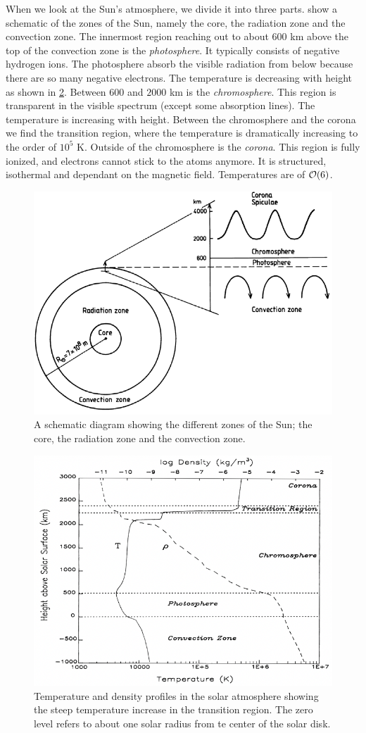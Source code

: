 When we look at the Sun's atmosphere, we divide it into three parts.  show a schematic of the zones of the Sun, namely the core, the radiation zone and the convection zone. The innermost region reaching out to about 600 km above the top of the convection zone is the \emph{photosphere}. It typically consists of negative hydrogen ions. The photosphere absorb the visible radiation from below because there are so many negative electrons. The temperature is decreasing with height as shown in \cref{fig:L9_sun_temperatures}. Between 600 and \(\num{2000}\) km is the \emph{chromosphere}. This region is transparent in the visible spectrum (except some absorption lines). The temperature is increasing with height. Between the chromosphere and the corona we find the transition region, where the temperature is dramatically increasing to the order of \(10^5\) K. Outside of the chromosphere is the \emph{corona}. This region is fully ionized, and electrons cannot stick to the atoms anymore. It is structured, isothermal and dependant on the magnetic field. Temperatures are of \(\mathcal{O}{(6)}\).
\begin{figure}[t]
    \centering
    \includegraphics[width=.6\linewidth]{bilder/L9_zones_in_the_sun.png}
    \caption{A schematic diagram showing the different zones of the Sun; the core, the radiation zone and the convection zone.}\label{fig:L9_zones_in_the_sun}
\end{figure}
\begin{figure}[t]
    \centering
    \includegraphics[width=.6\linewidth]{bilder/L9_sun_temperature.png}
    \caption{Temperature and density profiles in the solar atmosphere showing the steep temperature increase in the transition region. The zero level refers to about one solar radius from te center of the solar disk.}\label{fig:L9_sun_temperatures}
\end{figure}

